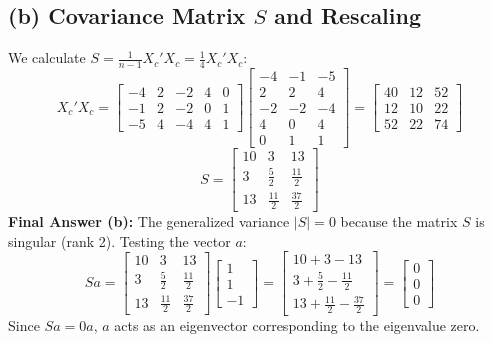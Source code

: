 \documentclass[12pt]{article}
\begin{document}
\subsection*{(b) Covariance Matrix $S$ and Rescaling}
We calculate $S = \frac{1}{n-1}X_c'X_c = \frac{1}{4}X_c'X_c$:
$$ X_c' X_c = \begin{bmatrix} -4 & 2 & -2 & 4 & 0 \\ -1 & 2 & -2 & 0 & 1 \\ -5 & 4 & -4 & 4 & 1 \end{bmatrix} \begin{bmatrix} -4 & -1 & -5 \\ 2 & 2 & 4 \\ -2 & -2 & -4 \\ 4 & 0 & 4 \\ 0 & 1 & 1 \end{bmatrix} = \begin{bmatrix} 40 & 12 & 52 \\ 12 & 10 & 22 \\ 52 & 22 & 74 \end{bmatrix} $$
$$ S = \begin{bmatrix} 10 & 3 & 13 \\ 3 & \frac{5}{2} & \frac{11}{2} \\ 13 & \frac{11}{2} & \frac{37}{2} \end{bmatrix} $$
\textbf{Final Answer (b):} The generalized variance $|S| = 0$ because the matrix $S$ is singular (rank 2). Testing the vector $a$:
$$ Sa = \begin{bmatrix} 10 & 3 & 13 \\ 3 & \frac{5}{2} & \frac{11}{2} \\ 13 & \frac{11}{2} & \frac{37}{2} \end{bmatrix} \begin{bmatrix} 1 \\ 1 \\ -1 \end{bmatrix} = \begin{bmatrix} 10 + 3 - 13 \\ 3 + \frac{5}{2} - \frac{11}{2} \\ 13 + \frac{11}{2} - \frac{37}{2} \end{bmatrix} = \begin{bmatrix} 0 \\ 0 \\ 0 \end{bmatrix} $$
Since $Sa = 0a$, $a$ acts as an eigenvector corresponding to the eigenvalue zero.
\end{document}
